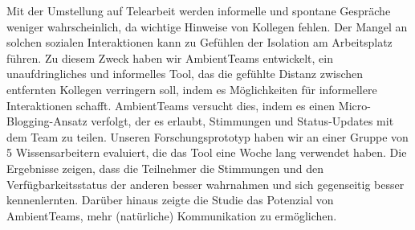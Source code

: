 \documentclass{seal_thesis}
\begin{document}
\begin{zusammenfassung}
    Mit der Umstellung auf Telearbeit werden informelle und spontane Gespräche weniger wahrscheinlich, da wichtige Hinweise von Kollegen fehlen. Der Mangel an solchen sozialen Interaktionen kann zu Gefühlen der Isolation am Arbeitsplatz führen. Zu diesem Zweck haben wir AmbientTeams entwickelt, ein unaufdringliches und informelles Tool, das die gefühlte Distanz zwischen entfernten Kollegen verringern soll, indem es Möglichkeiten für informellere Interaktionen schafft. AmbientTeams versucht dies, indem es einen Micro-Blogging-Ansatz verfolgt, der es erlaubt, Stimmungen und Status-Updates mit dem Team zu teilen. Unseren Forschungsprototyp haben wir an einer Gruppe von 5 Wissensarbeitern evaluiert, die das Tool eine Woche lang verwendet haben. Die Ergebnisse zeigen, dass die Teilnehmer die Stimmungen und den Verfügbarkeitsstatus der anderen besser wahrnahmen und sich gegenseitig besser kennenlernten. Darüber hinaus zeigte die Studie das Potenzial von AmbientTeams, mehr (natürliche) Kommunikation zu ermöglichen.
\end{zusammenfassung}

\tableofcontents
\listoffigures
\listoftables

\mainmatter









\begin{appendices}
    
\end{appendices}


\backmatter
\printbibliography
\end{document}
